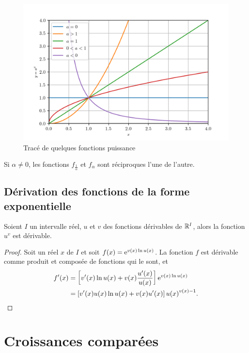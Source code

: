 \begin{figure}
  \centering
  \includegraphics[scale = 0.7]{puiss.png}
  \caption{Tracé de quelques fonctions 
  puissance}\label{figtracepuissance}
\end{figure}

Si \(\alpha \neq 0\), les fonctions \(f_{\frac{1}{\alpha}}\) et 
\(f_\alpha\) sont réciproques l'une de l'autre.

\subsection{Dérivation des fonctions de la forme 
exponentielle}\label{subsec:chap1-derivationdesfonctionsdelaformeexponentielle}

\begin{prop}
  Soient \(I\) un intervalle réel, \(u\) et \(v\) des fonctions 
  dérivables de \(\mathbb{R}^{I}\), alors la fonction \(u^v\) est dérivable.
\end{prop}
\begin{proof}
  Soit un réel \(x\) de \(I\) et soit \(f(x) = \operatorname{e}^{v(x) \ln u(x)}\).  La 
  fonction \(f\) est dérivable comme produit et composée de fonctions qui 
  le sont, et
  \begin{align*}
    f'(x) & = \left[ v'(x) \ln u(x) + v(x) \frac{u'(x)}{u(x)} 
    \right]\operatorname{e}^{v(x) \ln u(x)} \\
    &= \left[v'(x)u(x)\ln u(x) + v(x) u'(x) \right]{u(x)}^{v(x)-1}.
  \end{align*}
\end{proof}

\section{Croissances comparées}\label{sec:chap1-croissancescomparees}

